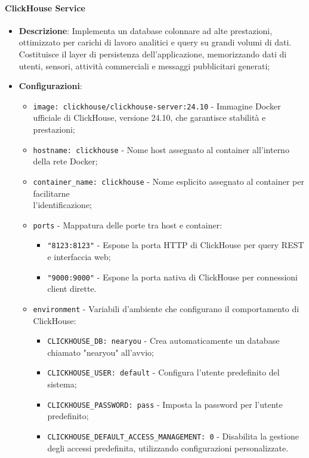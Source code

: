 \documentclass[10pt]{article}
\begin{document}
        \paragraph{ClickHouse Service}
        \begin{itemize} 
        \item \textbf{Descrizione}: Implementa un database colonnare ad alte prestazioni, ottimizzato per carichi di lavoro analitici e query su grandi volumi di dati. Costituisce il layer di persistenza dell'applicazione, memorizzando dati di utenti, sensori, attività commerciali e messaggi pubblicitari generati;
        \item \textbf{Configurazioni}:
        \begin{itemize}
            \item \texttt{image: clickhouse/clickhouse-server:24.10} - Immagine Docker ufficiale di ClickHouse, versione 24.10, che garantisce stabilità e prestazioni;
            \item \texttt{hostname: clickhouse} - Nome host assegnato al container all'interno della rete Docker;
            \item \texttt{container\_name: clickhouse} - Nome esplicito assegnato al container per facilitarne\\ l'identificazione;
            \item \texttt{ports} - Mappatura delle porte tra host e container:
            \begin{itemize}
                \item \texttt{"8123:8123"} - Espone la porta HTTP di ClickHouse per query REST e interfaccia web;
                \item \texttt{"9000:9000"} - Espone la porta nativa di ClickHouse per connessioni client dirette.
            \end{itemize}
            \item \texttt{environment} - Variabili d'ambiente che configurano il comportamento di ClickHouse:
            \begin{itemize}
                \item \texttt{CLICKHOUSE\_DB: nearyou} - Crea automaticamente un database chiamato "nearyou" all'avvio;
                \item \texttt{CLICKHOUSE\_USER: default} - Configura l'utente predefinito del sistema;
                \item \texttt{CLICKHOUSE\_PASSWORD: pass} - Imposta la password per l'utente predefinito;
                \item \texttt{CLICKHOUSE\_DEFAULT\_ACCESS\_MANAGEMENT: 0} - Disabilita la gestione degli accessi predefinita, utilizzando configurazioni personalizzate.

\end{itemize}
\end{itemize}
\end{itemize}
\end{document}
